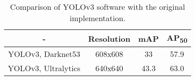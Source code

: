 \begin{table}[!htbp]
    \centering
    \caption[Comparison of YOLOv3 software with the original implementation]
    {Comparison of YOLOv3 software with the original implementation.}
     \begin{tabular}{||c | c | c c||} 
     \hline
      - & Resolution & mAP & AP\textsubscript{50} \\ [0.5ex]
     \hline\hline
      YOLOv3, Darknet53 & 608x608 & 33 & 57.9\\ 
     \hline
     YOLOv3, Ultralytics & 640x640 & 43.3 & 63.0 \\
     \hline
    \end{tabular}
    \label{tab:yolov3_comparison}
\end{table}